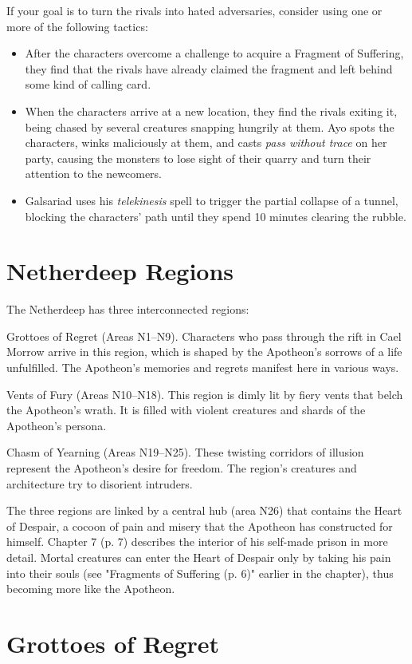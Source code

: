 \documentclass[a4paper, 11pt, bg=full, twocolumn, nooutline]{dndbook}
\begin{document}
If your goal is to turn the rivals into hated adversaries, consider using one or more of the following tactics:

\begin{itemize}
\item After the characters overcome a challenge to acquire a Fragment of Suffering, they find that the rivals have already claimed the fragment and left behind some kind of calling card.
\item When the characters arrive at a new location, they find the rivals exiting it, being chased by several creatures snapping hungrily at them. Ayo spots the characters, winks maliciously at them, and casts \textit{pass without trace} on her party, causing the monsters to lose sight of their quarry and turn their attention to the newcomers.
\item Galsariad uses his \textit{telekinesis} spell to trigger the partial collapse of a tunnel, blocking the characters' path until they spend 10 minutes clearing the rubble.
\end{itemize}
\section{Netherdeep Regions}

The Netherdeep has three interconnected regions:

Grottoes of Regret (Areas N1--N9). Characters who pass through the rift in Cael Morrow arrive in this region, which is shaped by the Apotheon's sorrows of a life unfulfilled. The Apotheon's memories and regrets manifest here in various ways.

Vents of Fury (Areas N10--N18). This region is dimly lit by fiery vents that belch the Apotheon's wrath. It is filled with violent creatures and shards of the Apotheon's persona.

Chasm of Yearning (Areas N19--N25). These twisting corridors of illusion represent the Apotheon's desire for freedom. The region's creatures and architecture try to disorient intruders.

The three regions are linked by a central hub (area N26) that contains the Heart of Despair, a cocoon of pain and misery that the Apotheon has constructed for himself. Chapter 7 (p. 7) describes the interior of his self-made prison in more detail. Mortal creatures can enter the Heart of Despair only by taking his pain into their souls (see "Fragments of Suffering (p. 6)" earlier in the chapter), thus becoming more like the Apotheon.
\section{Grottoes of Regret}
\end{document}
